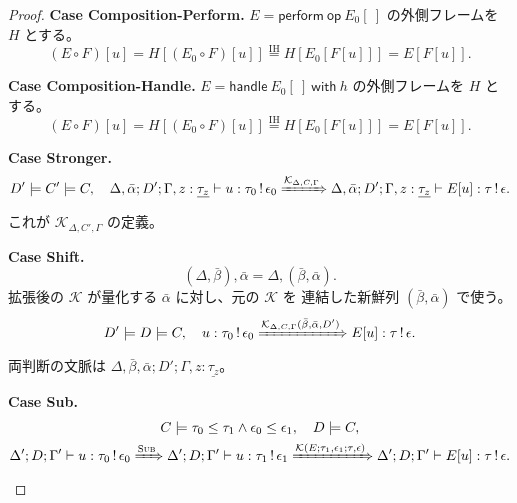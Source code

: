 \documentclass[a4paper,11pt]{article}
\theoremstyle{definition}
\newenvironment{Case}[1]{\par\smallskip\noindent\textbf{Case #1.}\enspace\ignorespaces}{\par}
\newcommand{\op}{\mathsf{op}}
\newcommand{\jj}[6]{#1;#2;#3\vdash #4:#5\,!\,#6}
\newcommand{\perform}[2]{\mathsf{perform}\ #1\ #2}
\newcommand{\handle}[2]{\mathsf{handle}\ #1\ \mathsf{with}\ #2}
\newcommand{\mono}[1]{\underline{#1}}
\newcommand{\Rule}[1]{\textsc{#1}}
\begin{document}
\begin{proof}
\begin{Case}{Composition-Perform}
$E=\perform\op{E_0[\ ]}$ の外側フレームを $H$ とする。
\[(E\circ F)[u]=H[(E_0\circ F)[u]]
 \overset{\mathrm{IH}}{=}H[E_0[F[u]]]=E[F[u]].\]
\end{Case}

\begin{Case}{Composition-Handle}
$E=\handle{E_0[\ ]}h$ の外側フレームを $H$ とする。
\[(E\circ F)[u]=H[(E_0\circ F)[u]]
 \overset{\mathrm{IH}}{=}H[E_0[F[u]]]=E[F[u]].\]
\end{Case}

\begin{Case}{Stronger}
\[
 D'\models C'\models C,\quad\jj{\Delta,\bar\alpha}{D'}{\Gamma,z:\mono{\tau_z}}u{\tau_0}{\epsilon_0}
 \xRightarrow{\mathcal K_{\Delta,C,\Gamma}}
 \jj{\Delta,\bar\alpha}{D'}{\Gamma,z:\mono{\tau_z}}{E[u]}\tau\epsilon.
\]
これが $\mathcal K_{\Delta,C',\Gamma}$ の定義。
\end{Case}

\begin{Case}{Shift}
\[
 (\Delta,\bar\beta),\bar\alpha=\Delta,(\bar\beta,\bar\alpha).
\]
拡張後の $\mathcal K$ が量化する $\bar\alpha$ に対し、元の $\mathcal K$ を
連結した新鮮列 $(\bar\beta,\bar\alpha)$ で使う。
\[
 D'\models D\models C,\quad u:\tau_0\,!\,\epsilon_0
 \xRightarrow{\mathcal K_{\Delta,C,\Gamma}(\bar\beta,\bar\alpha,D')}
 E[u]:\tau\,!\,\epsilon.
\]
両判断の文脈は $\Delta,\bar\beta,\bar\alpha;D';\Gamma,z:\mono{\tau_z}$。
\end{Case}

\begin{Case}{Sub}
\begin{gather*}
 C\models\tau_0\leq\tau_1\land\epsilon_0\leq\epsilon_1,\quad D\models C,\\
 \jj{\Delta'}D{\Gamma'}u{\tau_0}{\epsilon_0}
 \xRightarrow{\Rule{Sub}}\jj{\Delta'}D{\Gamma'}u{\tau_1}{\epsilon_1}
 \xRightarrow{\mathcal K(E;\tau_1,\epsilon_1;\tau,\epsilon)}
 \jj{\Delta'}D{\Gamma'}{E[u]}\tau\epsilon.
\end{gather*}
\end{Case}
\end{proof}
\end{document}
